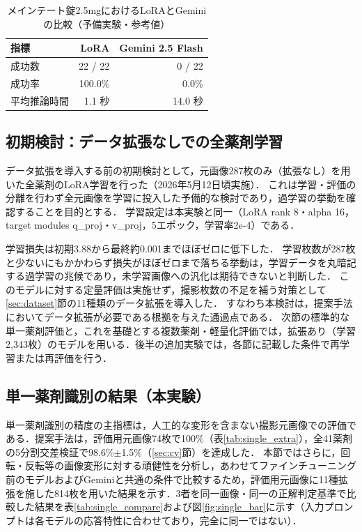 \documentclass[dvipdfmx]{jsarticle}
\begin{document}
\begin{table}[htbp]
\centering
\caption{メインテート錠2.5mgにおけるLoRAとGeminiの比較（予備実験・参考値）}
\label{tab:vs_gemini}
\begin{tabular}{lrr}
\hline
指標 & LoRA & Gemini 2.5 Flash \\
\hline
成功数 & 22 / 22 & 0 / 22 \\
成功率 & 100.0\% & 0.0\% \\
平均推論時間 & 1.1 秒 & 14.0 秒 \\
\hline
\end{tabular}
\end{table}

\subsection{初期検討：データ拡張なしでの全薬剤学習}\label{sec:noaug}

データ拡張を導入する前の初期検討として，元画像287枚のみ（拡張なし）を用いた全薬剤のLoRA学習を行った（2026年5月12日頃実施）．
これは学習・評価の分離を行わず全元画像を学習に投入した予備的な検討であり，過学習の挙動を確認することを目的とする．
学習設定は本実験と同一（LoRA rank 8・alpha 16，target modules q\_proj・v\_proj，5エポック，学習率2e-4）である．

学習損失は初期3.88から最終約0.001までほぼゼロに低下した．
学習枚数が287枚と少ないにもかかわらず損失がほぼゼロまで落ちる挙動は，学習データを丸暗記する過学習の兆候であり，未学習画像への汎化は期待できないと判断した．
このモデルに対する定量評価は実施せず，撮影枚数の不足を補う対策として\ref{sec:dataset}節の11種類のデータ拡張を導入した．
すなわち本検討は，提案手法においてデータ拡張が必要である根拠を与えた通過点である．
次節の標準的な単一薬剤評価と，これを基礎とする複数薬剤・軽量化評価では，拡張あり（学習2,343枚）のモデルを用いる．後半の追加実験では，各節に記載した条件で再学習または再評価を行う．

\subsection{単一薬剤識別の結果（本実験）}\label{sec:single_result}

単一薬剤識別の精度の主指標は，人工的な変形を含まない撮影元画像での評価である．提案手法は，評価用元画像74枚で100\%（表\ref{tab:single_extra}），全41薬剤の5分割交差検証で98.6\%$\pm$1.5\%（\ref{sec:cv}節）を達成した．
本節ではさらに，回転・反転等の画像変形に対する頑健性を分析し，あわせてファインチューニング前のモデルおよびGeminiと共通の条件で比較するため，評価用元画像に11種拡張を施した814枚を用いた結果を示す．3者を同一画像・同一の正解判定基準で比較した結果を表\ref{tab:single_compare}および図\ref{fig:single_bar}に示す（入力プロンプトは各モデルの応答特性に合わせており，完全に同一ではない）．
\end{document}
